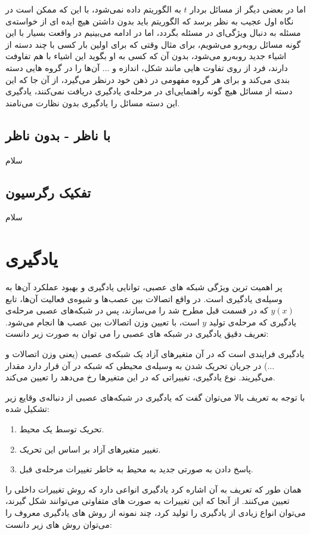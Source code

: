 \documentclass[11pt,a4paper,twocolumn]{article}
\begin{document}
 اما در بعضی دیگر از مسائل بردار $t$ به الگوریتم داده نمی‌شود، با این که ممکن است در نگاه اول عجیب به نظر برسد که الگوریتم باید بدون داشتن هیچ ایده ای از خواسته‌ی مسئله به دنبال ویژگی‌ای در مسئله بگردد، اما در ادامه می‌بینیم در واقعت بسیار با این گونه مسائل رو‌به‌رو می‌شویم، برای مثال وقتی که برای اولین بار کسی با چند دسته از اشیاء جدید روبه‌رو می‌شود، بدون آن که کسی به او بگوید این اشیاء با هم تفاوفت دارند، فرد  از روی تفاوت هایی مانند شکل، اندازه و ... آن‌ها را در گروه هایی دسته بندی می‌کند و برای هر گروه مفهومی در ذهن خود درنظر می‌گیرد، از آن جا که این دسته از مسائل هیچ گونه راهنمایی‌ای در مرحله‌ی یادگیری دریافت نمی‌کنند، یادگیری این دسته مسائل را یادگیری بدون نظارت می‌نامند.
\subsection{با ناظر - بدون ناظر}
سلام
\subsection{تفکیک رگرسیون}
سلام
\section{یادگیری}
پر اهمیت ترین ویژگی شبکه های عصبی، توانایی یادگیری و بهبود عملکرد آن‌ها به وسیله‌ی یادگیری است. در واقع اتصالات بین عصب‌ها و شیوه‌ی فعالیت آن‌ها، تابع $y(x)$  که در قسمت قبل مطرح شد را می‌سازند، پس در شبکه‌های عصبی مرحله‌ی یادگیری که مرحله‌ی تولید $y$ است، با تعیین وزن اتصالات بین عصب ها انجام می‌شود. تعریف دقیق یادگیری در شبکه های عصبی را می توان به صورت زیر دانست:

یادگیری فرایندی است که در آن متغیر‌های آزاد یک شبکه‌ی عصبی (یعنی وزن اتصالات و ...) در جریان تحریک شدن به وسیله‌ی محیطی که شبکه در آن قرار دارد مقدار می‌گیریند. نوع یادگیری، تغییراتی که در این متغیر‌ها رخ می‌دهد را تعیین می‌کند.\cite[ص-۵۰]{haykin}

با توجه به تعریف بالا می‌توان گفت که یادگیری در شبکه‌های عصبی از دنباله‌ی وقایع زیر تشکیل شده:

\begin{enumerate}
\item
تحریک توسط یک محیط.
\item
تغییر متغیر‌های آزاد بر اساس این تحریک.
\item
پاسخ دادن به صورتی جدید به محیط به خاطر تغییرات مرحله‌ی قبل.
\end{enumerate}

همان طور که تعریف به آن اشاره کرد یادگیری انواعی دارد که روش تغییرات داخلی را تعیین می‌کنند. از آنجا که این تغییرات به صورت های متفاوتی می‌توانند شکل گیرند، می‌توان انواع زیادی از یادگیری را تولید کرد، چند نمونه از روش های یادگیری معروف را می‌توان روش های زیر دانست:
\end{document}
